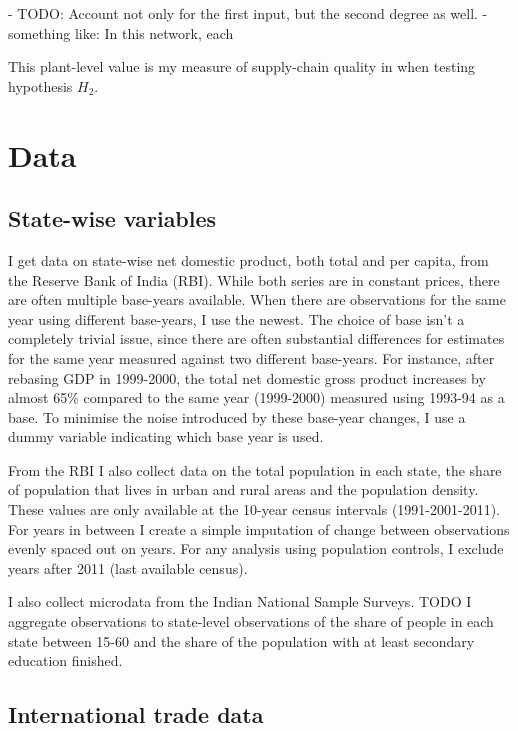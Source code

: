 \documentclass[11pt]{article}
\begin{document}
- TODO: Account not only for the first input, but the second degree as well. - something like: In this network, each


This plant-level value is my measure of supply-chain quality in when testing hypothesis \(H_2\).

\section{Data}%
\label{sub:data}

\subsection{State-wise variables}%
\label{sub:state_wise_variables}

I get data on state-wise net domestic product, both total and per capita, from the Reserve Bank of India (RBI). While both series are in constant prices, there are often multiple base-years available. When there are observations for the same year using different base-years, I use the newest. The choice of base isn't a completely trivial issue, since there are often substantial differences for estimates for the same year measured against two different base-years. For instance, after rebasing GDP in 1999-2000, the total net domestic gross product increases by almost 65\% compared to the same year (1999-2000) measured using 1993-94 as a base. To minimise the noise introduced by these base-year changes, I use a dummy variable indicating which base year is used.

From the RBI I also collect data on the total population in each state, the share of population that lives in urban and rural areas and the population density. These values are only available at the 10-year census intervals (1991-2001-2011). For years in between I create a simple imputation of change between observations evenly spaced out on years. For any analysis using population controls, I exclude years after 2011 (last available census).

I also collect microdata from the Indian National Sample Surveys. TODO I aggregate observations to state-level observations of the share of people in each state between 15-60 and the share of the population with at least secondary education finished.

\subsection{International trade data}%
\label{sub:international_trade_data}
\end{document}
